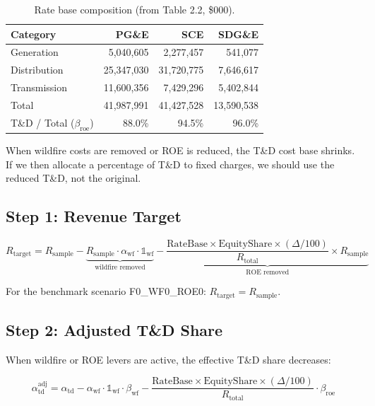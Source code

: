 \documentclass[11pt]{article}
\begin{document}
\begin{table}[htbp]
\centering
\caption{Rate base composition (from Table 2.2, \$000).}
\begin{tabular}{l r r r}
\toprule
\textbf{Category} & \textbf{PG\&E} & \textbf{SCE} & \textbf{SDG\&E} \\
\midrule
Generation & 5,040,605 & 2,277,457 & 541,077 \\
Distribution & 25,347,030 & 31,720,775 & 7,646,617 \\
Transmission & 11,600,356 & 7,429,296 & 5,402,844 \\
\midrule
Total & 41,987,991 & 41,427,528 & 13,590,538 \\
\midrule
T\&D / Total ($\beta_{\text{roe}}$) & 88.0\% & 94.5\% & 96.0\% \\
\bottomrule
\end{tabular}
\end{table}

When wildfire costs are removed or ROE is reduced, the T\&D cost base shrinks. If we then allocate a percentage of T\&D to fixed charges, we should use the reduced T\&D, not the original.

\subsection{Step 1: Revenue Target}

\begin{equation}
\boxed{R_{\text{target}} = R_{\text{sample}} - \underbrace{R_{\text{sample}} \cdot \alpha_{\text{wf}} \cdot \mathbb{1}_{\text{wf}}}_{\text{wildfire removed}} - \underbrace{\frac{\text{RateBase} \times \text{EquityShare} \times (\Delta/100)}{R_{\text{total}}} \times R_{\text{sample}}}_{\text{ROE removed}}}
\end{equation}

For the benchmark scenario F0\_WF0\_ROE0: $R_{\text{target}} = R_{\text{sample}}$.

\subsection{Step 2: Adjusted T\&D Share}

When wildfire or ROE levers are active, the effective T\&D share decreases:

\begin{equation}
\boxed{\alpha_{\text{td}}^{\text{adj}} = \alpha_{\text{td}} - \alpha_{\text{wf}} \cdot \mathbb{1}_{\text{wf}} \cdot \beta_{\text{wf}} - \frac{\text{RateBase} \times \text{EquityShare} \times (\Delta/100)}{R_{\text{total}}} \cdot \beta_{\text{roe}}}
\end{equation}
\end{document}
